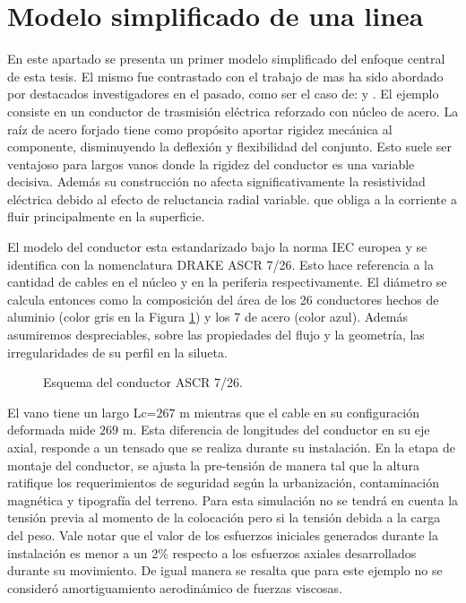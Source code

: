 \section{Modelo simplificado de una linea}\label{Sec:RN:FotiCable}
En este apartado se presenta un primer modelo simplificado del enfoque central de esta tesis. El mismo fue contrastado con el trabajo de \cite{foti2018finite} mas ha sido abordado por destacados investigadores en el pasado, como ser el caso de: \cite{luongo1998non} y \cite{martinelli2001numerical}. El ejemplo consiste en un conductor de trasmisión eléctrica reforzado con núcleo de acero. La raíz de acero forjado tiene como propósito aportar rigidez mecánica al componente, disminuyendo la deflexión y flexibilidad del conjunto. Esto suele ser ventajoso para largos vanos donde la rigidez del conductor es una variable decisiva. Además su construcción no afecta significativamente la resistividad eléctrica debido al efecto de reluctancia radial variable. que obliga a la corriente a fluir principalmente en la superficie. 

El modelo del conductor esta estandarizado bajo la norma IEC europea \cite{IEC60826} y se identifica con la nomenclatura DRAKE ASCR 7/26. Esto hace referencia a la cantidad de cables en el núcleo y en la periferia respectivamente. El diámetro se calcula entonces como la composición del área de los 26 conductores hechos de aluminio (color gris en la Figura 	\ref{fig:RN:FotiCable:Perfil}) y los 7 de acero (color azul).  Además asumiremos despreciables, sobre las propiedades del flujo y la geometría, las irregularidades de su perfil en la silueta. 

\begin{figure}[htbp]
	\centering
	\def\svgwidth{80mm}
	
	\caption{Esquema del conductor  ASCR 7/26.}
	\label{fig:RN:FotiCable:Perfil}
\end{figure}



El vano tiene un largo Lc=$267$ m mientras que el cable en su configuración deformada mide $269$ m.  Esta diferencia de longitudes del conductor en su eje axial, responde a un tensado que se realiza durante su instalación. En la etapa de montaje del conductor, se ajusta la pre-tensión de manera tal que la altura ratifique los requerimientos de seguridad según la urbanización, contaminación magnética y tipografía del terreno. Para esta simulación no se tendrá en cuenta la tensión previa al momento de la colocación pero si la tensión debida a la carga del peso. Vale notar que el valor de los esfuerzos iniciales generados durante la instalación es menor a un 2\% respecto a los esfuerzos axiales desarrollados durante su movimiento. De igual manera se resalta que para este ejemplo no se consideró amortiguamiento aerodinámico de fuerzas viscosas. 

